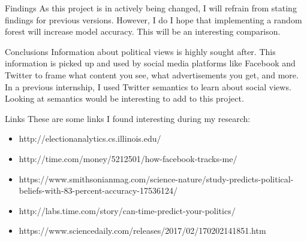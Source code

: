 \documentclass[10pt]{beamer}
\begin{document}
\begin{frame}{Findings}
	As this project is in actively being changed, I will refrain from stating findings for previous versions. However, I do I hope that implementing a random forest will increase model accuracy. This will be an interesting comparison.
\end{frame}


\begin{frame}{Conclusions}
	Information about political views is highly sought after. This information is picked up and used by social media platforms like Facebook and Twitter to frame what content you see, what advertisements you get, and more. In a previous internship, I used Twitter semantics to learn about social views. Looking at semantics would be interesting to add to this project.
\end{frame}

\begin{frame}{Links}
    These are some links I found interesting during my research:
	\begin{itemize}
	    \item http://electionanalytics.cs.illinois.edu/
	    \item http://time.com/money/5212501/how-facebook-tracks-me/
	    \item https://www.smithsonianmag.com/science-nature/study-predicts-political-beliefs-with-83-percent-accuracy-17536124/
	    \item http://labs.time.com/story/can-time-predict-your-politics/
	    \item https://www.sciencedaily.com/releases/2017/02/170202141851.htm
	\end{itemize}
\end{frame}
\end{document}

